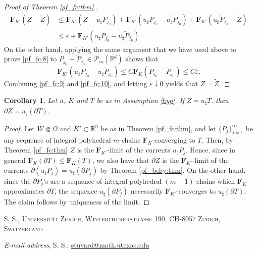 \documentclass[a4paper,11pt,reqno]{amsart}
\makeatletter
\newtheorem{corollary}[theorem]{Corollary}
\theoremstyle{definition}
\numberwithin{equation}{section}
\numberwithin{subsection}{section}
\newcommand{\R}{\mathbb{R}}
\newcommand{\Fl}{\mathbf{F}}
\newcommand{\Addresses}{{%
  \bigskip
  \footnotesize

  S. S., \textsc{Universit\"at Z\"urich, Winterthurerstrasse 190, CH-8057 Z\"urich, Switzerland}
  \par\nopagebreak
  
\bigskip 
 
  \textit{E-mail address}, S. S.: \href{stuvard@math.utexas.edu}{stuvard@math.utexas.edu}
   
}}
\makeatother
\begin{document}
\begin{proof}[Proof of Theorem \ref{pf_fc:thm}.]
\begin{equation} \label{pf_fc:9}
\begin{split}
\Fl_{K'}(Z - \tilde{Z}) &\leq \Fl_{K'}(Z - u_{\sharp}P_{j_0}) + \Fl_{K'}(u_{\sharp}P_{j_0} - u_{\sharp}\tilde{P}_{j_0}) + \Fl_{K'}(u_{\sharp}\tilde{P}_{j_0} - \tilde{Z}) \\
&\leq  \varepsilon + \Fl_{K'}(u_{\sharp}P_{j_0} - u_{\sharp}\tilde{P}_{j_0})
\end{split}
\end{equation}
On the other hand, applying the same argument that we have used above to prove \eqref{pf_fc:8} to $P_{j_0} - \tilde{P}_{j_0} \in \mathscr{P}_{m}(\R^{d})$ shows that
\begin{equation} \label{pf_fc:10}
\Fl_{K'}(u_{\sharp} P_{j_0} - u_{\sharp}\tilde{P}_{j_0}) \leq C \Fl_{K}(P_{j_0} - \tilde{P}_{j_0}) \leq C \varepsilon.
\end{equation}
Combining \eqref{pf_fc:9} and \eqref{pf_fc:10}, and letting $\varepsilon \downarrow 0$ yields that $Z = \tilde{Z}$.
\end{proof}

\begin{corollary}
Let $u$, $K$ and $T$ be as in Assumption \ref{hyp}. If $Z = u_{\sharp}T$, then $\partial Z = u_{\sharp}(\partial T)$.
\end{corollary}

\begin{proof}
Let $W \Subset \Omega$ and $K' \subset \R^{n}$ be as in Theorem \ref{pf_fc:thm}, and let $\lbrace P_{j} \rbrace_{j=1}^{\infty}$ be any sequence of integral polyhedral $m$-chains $\Fl_{K}$-converging to $T$. Then, by Theorem \ref{pf_fc:thm} $Z$ is the $\Fl_{K'}$-limit of the currents $u_{\sharp}P_{j}$. Hence, since in general $\Fl_{K}(\partial T) \leq \Fl_{K}(T)$, we also have that $\partial Z$ is the $\Fl_{K'}$-limit of the currents $\partial (u_{\sharp}P_{j}) = u_{\sharp}(\partial P_{j})$ by Theorem \ref{pf_bdry:thm}. On the other hand, since the $\partial P_{j}$'s are a sequence of integral polyhedral $(m-1)$-chains which $\Fl_{K}$-approximates $\partial T$, the sequence $u_{\sharp}(\partial P_{j})$ necessarily $\Fl_{K'}$-converges to $u_{\sharp}(\partial T)$. The claim follows by uniqueness of the limit.
\end{proof}


%
%
%
%
%
%
%
%














\Addresses
\end{document}
